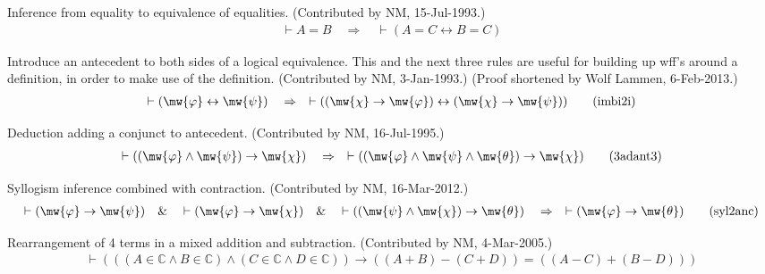 \begin{lemma} Inference from equality to equivalence of
equalities.  (Contributed by
       NM, 15-Jul-1993.)
\begin{align}
\vdash A = B\quad\Rightarrow\quad \vdash ( A = C \leftrightarrow B = C
    )\label{eq:eqeq1i}\tag{eqeq1i}
\end{align}
\end{lemma}


\begin{lemma} Introduce an antecedent to both sides of a
logical equivalence.  This
       and the next three rules are useful for building up wff's around a
       definition, in order to make use of the definition.  (Contributed by
NM,
       3-Jan-1993.)  (Proof shortened by Wolf Lammen, 6-Feb-2013.)
\begin{align}
\vdash ( \mw{\varphi} \leftrightarrow \mw{\psi} )\quad\Rightarrow\quad \vdash (
    ( \mw{\chi} \rightarrow \mw{\varphi} ) \leftrightarrow ( \mw{\chi}
    \rightarrow \mw{\psi} ) )\label{eq:imbi2i}\tag{imbi2i}
\end{align}
\end{lemma}


\begin{lemma} Deduction adding a conjunct to antecedent. 
(Contributed by NM,
       16-Jul-1995.)
\begin{align}
\vdash ( ( \mw{\varphi} \wedge \mw{\psi} ) \rightarrow \mw{\chi}
    )\quad\Rightarrow\quad \vdash ( ( \mw{\varphi} \wedge \mw{\psi} \wedge
    \mw{\theta} ) \rightarrow \mw{\chi} )\label{eq:3adant3}\tag{3adant3}
\end{align}
\end{lemma}


\begin{lemma} Syllogism inference combined with
contraction.  (Contributed by NM,
       16-Mar-2012.)
\begin{align}
\vdash ( \mw{\varphi} \rightarrow \mw{\psi} )\quad\&\quad \vdash ( \mw{\varphi}
    \rightarrow \mw{\chi} )\quad\&\quad \vdash ( ( \mw{\psi} \wedge \mw{\chi} )
    \rightarrow \mw{\theta} )\quad\Rightarrow\quad \vdash ( \mw{\varphi}
    \rightarrow \mw{\theta} )\label{eq:syl2anc}\tag{syl2anc}
\end{align}
\end{lemma}


\begin{lemma} Rearrangement of 4 terms in a mixed
addition and subtraction.
     (Contributed by NM, 4-Mar-2005.)
\begin{align}
\vdash ( ( ( A \in \mathbb{C} \wedge B \in \mathbb{C} ) \wedge ( C \in
    \mathbb{C} \wedge D \in \mathbb{C} ) ) \rightarrow ( ( A + B ) \minus ( C +
    D ) ) = ( ( A \minus C ) + ( B \minus D ) )
    )\label{eq:addsub4}\tag{addsub4}
\end{align}
\end{lemma}


